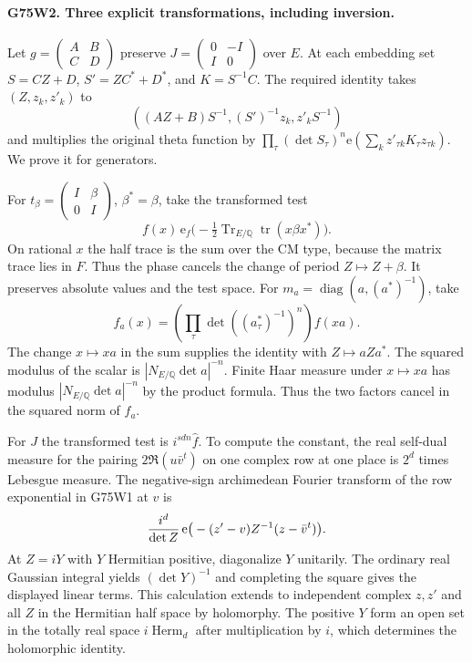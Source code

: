 \paragraph{G75W2. Three explicit transformations, including inversion.}
Let $g=\left(\begin{smallmatrix}A&B\\C&D\end{smallmatrix}\right)$
preserve $J=\left(\begin{smallmatrix}0&-I\\I&0\end{smallmatrix}\right)$
over $E$. At each embedding set $S=CZ+D$, $S'=ZC^*+D^*$,
and $K=S^{-1}C$. The required identity takes $(Z,z_k,z'_k)$ to
\[
 ((AZ+B)S^{-1},(S')^{-1}z_k,z'_kS^{-1})
\]
and multiplies the original theta function by
$\prod_\tau (\det S_\tau)^n
\mathrm e(\sum_k z'_{\tau k}K_\tau z_{\tau k})$.
We prove it for generators.

For $t_\beta=\left(\begin{smallmatrix}I&\beta\\0&I\end{smallmatrix}\right)$,
$\beta^*=\beta$, take the transformed test
\[
 f(x)\,\mathrm e_f\big(-\tfrac12
      \operatorname{Tr}_{E/\mathbb Q}\operatorname{tr}(x\beta x^*)\big).
\]
On rational $x$ the half trace is the sum over the CM type, because
the matrix trace lies in $F$. Thus the phase cancels the change of
period $Z\mapsto Z+\beta$. It preserves absolute values and the test
space. For $m_a=\operatorname{diag}(a,(a^*)^{-1})$, take
\[
 f_a(x)=\left(\prod_{\tau}\det((a_\tau^*)^{-1})^n\right)f(xa).
\]
The change $x\mapsto xa$ in the sum supplies the identity with
$Z\mapsto aZa^*$. The squared modulus of the scalar is
$|N_{E/\mathbb Q}\det a|^{-n}$. Finite Haar measure under $x\mapsto xa$
has modulus $|N_{E/\mathbb Q}\det a|^{-n}$ by the product formula.
Thus the two factors cancel in the squared norm of $f_a$.

For $J$ the transformed test is $i^{sdn}\widehat f$. To compute the
constant, the real self-dual measure for the pairing
$2\Re(u\bar v^t)$ on one complex row at one place is $2^d$ times
Lebesgue measure. The negative-sign archimedean Fourier transform
of the row exponential in G75W1 at $v$ is
\[
 {i^d\over\det Z}\,
 \mathrm e\big(-(z'-v)Z^{-1}(z-\bar v^t)\big).
\]
At $Z=iY$ with $Y$ Hermitian positive, diagonalize $Y$ unitarily.
The ordinary real Gaussian integral yields $(\det Y)^{-1}$ and
completing the square gives the displayed linear terms. This
calculation extends to independent complex $z,z'$ and all $Z$ in
the Hermitian half space by holomorphy. The positive $Y$ form an
open set in the totally real space $i\operatorname{Herm}_d$ after
multiplication by $i$, which determines the holomorphic identity.

